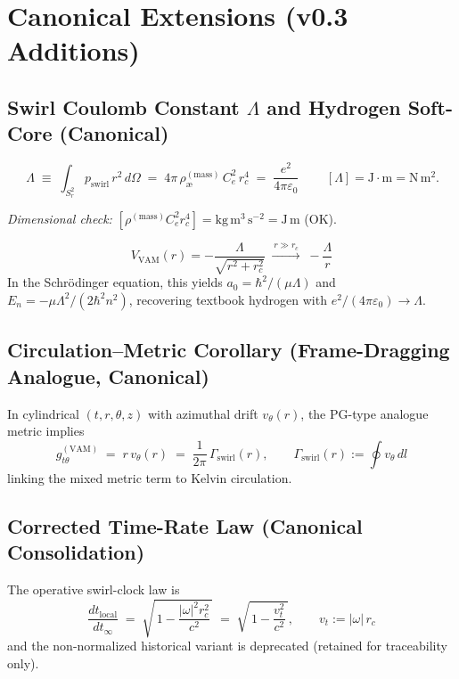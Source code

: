 \documentclass[11pt, a4paper]{article}
\begin{document}
\section{Canonical Extensions (v0.3 Additions)}

\subsection{Swirl Coulomb Constant $\Lambda$ and Hydrogen Soft-Core (Canonical)}
\label{subsec:canon-lambda}
\begin{definition}
    \[
        \boxed{\, \Lambda \;\equiv\; \int_{S_r^2} p_{\text{swirl}}\, r^2\, d\Omega
        \;=\; 4\pi\,\rho_{\text{\ae}}^{(\text{mass})}\,C_e^2\,r_c^4
        \;=\; \frac{e^2}{4\pi\varepsilon_0} \,}
        \qquad [\Lambda]=\mathrm{J\cdot m}=\mathrm{N\,m^2}.
    \]
\end{definition}
\noindent\textit{Dimensional check: }
$[\rho^{(\text{mass})} C_e^2 r_c^4]=\mathrm{kg\,m^3\,s^{-2}}=\mathrm{J\,m}$ (OK).

\begin{theorem}
    \[
        \boxed{\, V_{\text{VAM}}(r) = -\frac{\Lambda}{\sqrt{r^2+r_c^2}}
        \;\xrightarrow{\,r\gg r_c\,}\; -\frac{\Lambda}{r} \,}
    \]
    In the Schr\"odinger equation, this yields
    $a_0=\hbar^2/(\mu\Lambda)$ and $E_n=-\mu\Lambda^2/(2\hbar^2 n^2)$,
    recovering textbook hydrogen with $e^2/(4\pi\varepsilon_0)\to\Lambda$.
    \cite{Schrodinger1926,Jackson1999}
\end{theorem}

\subsection{Circulation–Metric Corollary (Frame-Dragging Analogue, Canonical)}
\label{subsec:canon-metric-circulation}
In cylindrical $(t,r,\theta,z)$ with azimuthal drift $v_\theta(r)$, the PG-type analogue metric implies
\[
    \boxed{\, g^{(\mathrm{VAM})}_{t\theta} \;=\; r\,v_\theta(r) \;=\; \frac{1}{2\pi}\,\Gamma_{\text{swirl}}(r),\qquad
    \Gamma_{\text{swirl}}(r):=\oint v_\theta\,dl \,}
\]
linking the mixed metric term to Kelvin circulation. \cite{Painleve1921,Gullstrand1922,Unruh1981,Visser1998,Kerr1963}

\subsection{Corrected Time-Rate Law (Canonical Consolidation)}
\label{subsec:canon-time-rate}
The operative swirl-clock law is
\[
    \boxed{\, \frac{dt_{\text{local}}}{dt_\infty} \;=\; \sqrt{\,1-\frac{|\omega|^2 r_c^2}{c^2}\,}
    \;=\; \sqrt{\,1-\frac{v_t^2}{c^2}\,},\qquad v_t:=|\omega|\,r_c \,}
\]
and the non-normalized historical variant is deprecated (retained for traceability only).
\end{document}
